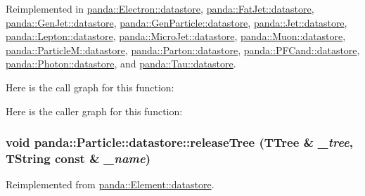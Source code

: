 Reimplemented in \hyperlink{structpanda_1_1Electron_1_1datastore_aca8cd939bbe2edf7b152348364b1ac4c}{panda::Electron::datastore}, \hyperlink{structpanda_1_1FatJet_1_1datastore_a83669574414333b1656878e0ec09c345}{panda::FatJet::datastore}, \hyperlink{structpanda_1_1GenJet_1_1datastore_a38a95477762b562ae4a6f2487e2c26ff}{panda::GenJet::datastore}, \hyperlink{structpanda_1_1GenParticle_1_1datastore_af83451f0c94efe8daeb7769571e81aef}{panda::GenParticle::datastore}, \hyperlink{structpanda_1_1Jet_1_1datastore_ac3a9ecd013ec5d5bf94f71ff013e5491}{panda::Jet::datastore}, \hyperlink{structpanda_1_1Lepton_1_1datastore_a44602d14a45e9a23ffdb02f9dfa7e018}{panda::Lepton::datastore}, \hyperlink{structpanda_1_1MicroJet_1_1datastore_ae893cdc52ad9ae8ffc8a8cea1cac1377}{panda::MicroJet::datastore}, \hyperlink{structpanda_1_1Muon_1_1datastore_aa1c3edc46b6ca55e9b77634cdd0e6684}{panda::Muon::datastore}, \hyperlink{structpanda_1_1ParticleM_1_1datastore_a4069b8cdca5715ed6faf0a7907ea8386}{panda::ParticleM::datastore}, \hyperlink{structpanda_1_1Parton_1_1datastore_af82916b07ec783b268c2491cd5b374be}{panda::Parton::datastore}, \hyperlink{structpanda_1_1PFCand_1_1datastore_a117b3a740a7d57118a35816456118685}{panda::PFCand::datastore}, \hyperlink{structpanda_1_1Photon_1_1datastore_a3a0f1b3be1d8cfa4bb5d6a5a6a48997d}{panda::Photon::datastore}, and \hyperlink{structpanda_1_1Tau_1_1datastore_af6634c2974f07bafef20c5a49dfd4050}{panda::Tau::datastore}.

Here is the call graph for this function:

Here is the caller graph for this function:\hypertarget{structpanda_1_1Particle_1_1datastore_a9fa2653f0e8b59a5cbc752beaf6b7a57}{
\subsubsection[{releaseTree}]{\setlength{\rightskip}{0pt plus 5cm}void panda::Particle::datastore::releaseTree (TTree \& {\em \_\-tree}, \/  TString const \& {\em \_\-name})}}
\label{structpanda_1_1Particle_1_1datastore_a9fa2653f0e8b59a5cbc752beaf6b7a57}


Reimplemented from \hyperlink{structpanda_1_1Element_1_1datastore_a7acb1440122c336e94738695ca5a11bd}{panda::Element::datastore}.

